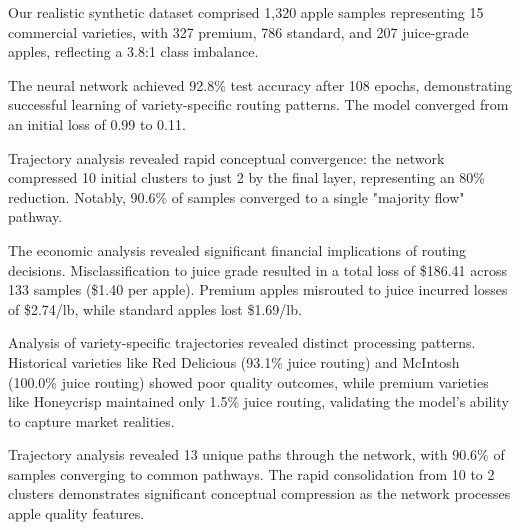 
Our realistic synthetic dataset comprised 1,320 apple samples 
representing 15 commercial varieties, with 
327 premium, 
786 standard, and 
207 juice-grade apples, 
reflecting a 3.8:1 class imbalance.


The neural network achieved 92.8\% test accuracy 
after 108 epochs, demonstrating successful 
learning of variety-specific routing patterns. The model converged from an initial loss 
of 0.99 to 0.11.


Trajectory analysis revealed rapid conceptual convergence: the network compressed 
10 initial clusters to just 
2 by the final layer, representing an 
80\% reduction. Notably, 
90.6\% of samples converged to a 
single "majority flow" pathway.


The economic analysis revealed significant financial implications of routing decisions. 
Misclassification to juice grade resulted in a total loss of \$186.41 
across 133 samples (\$1.40 per apple). 
Premium apples misrouted to juice incurred losses of \$2.74/lb, 
while standard apples lost \$1.69/lb.


Analysis of variety-specific trajectories revealed distinct processing patterns. 
Historical varieties like Red Delicious (93.1\% juice routing) 
and McIntosh (100.0\% juice routing) 
showed poor quality outcomes, while premium varieties like Honeycrisp maintained 
only 1.5\% juice routing, 
validating the model's ability to capture market realities.


Trajectory analysis revealed 13 unique paths through the network, 
with 90.6\% of samples converging to common pathways. 
The rapid consolidation from 10 to 2 
clusters demonstrates significant conceptual compression as the network processes apple quality features.

